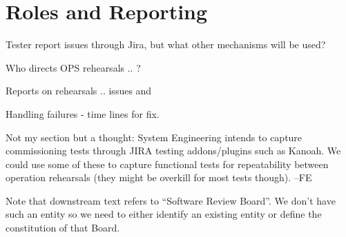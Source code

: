 




\section{Roles and Reporting}

Tester report issues through Jira, but what other mechanisms will be used?

Who directs OPS rehearsals .. ?

Reports on rehearsals .. issues and

Handling failures - time lines for fix.


\begin{note}
  Not my section but a thought: System Engineering intends to capture commissioning tests through JIRA testing addons/plugins such as Kanoah. We could use some of these to capture functional tests for repeatability between operation rehearsals (they might be overkill for most tests though). --FE
\end{note}

\begin{note}
  Note that downstream text refers to ``Software Review Board''. We don't have such an entity so we need to either identify an existing entity or define the constitution of that Board.
\end{note}



















